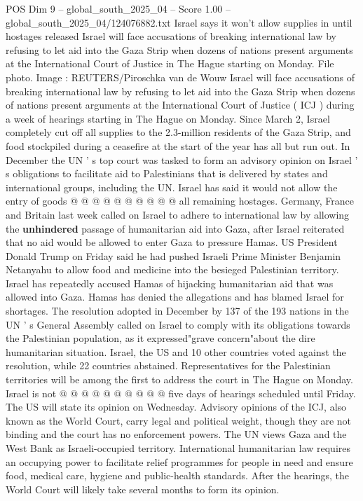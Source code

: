 \begin{textsample}{POS Dim 9 – global\_south\_2025\_04 – Score 1.00 – global\_south\_2025\_04/124076882.txt}  \label{ex:f9_pos_186}
Israel says it won't allow supplies in until hostages released Israel will face accusations of breaking international law by refusing to let aid into the Gaza Strip when dozens of nations present arguments at the International Court of Justice in The Hague starting on Monday.
File photo.
Image : REUTERS/Piroschka van de Wouw Israel will face accusations of breaking international law by refusing to let aid into the Gaza Strip when dozens of nations present arguments at the International Court of Justice ( ICJ ) during a week of hearings starting in The Hague on Monday.
Since March 2, Israel completely cut off all supplies to the 2.3-million residents of the Gaza Strip, and food stockpiled during a ceasefire at the start of the year has all but run out.
In December the UN ' s top court was tasked to form an advisory opinion on Israel ' s obligations to facilitate aid to Palestinians that is delivered by states and international groups, including the UN.
Israel has said it would not allow the entry of goods @ @ @ @ @ @ @ @ @ @ all remaining hostages.
Germany, France and Britain last week called on Israel to adhere to international law by allowing the \textbf{unhindered} passage of humanitarian aid into Gaza, after Israel reiterated that no aid would be allowed to enter Gaza to pressure Hamas.
US President Donald Trump on Friday said he had pushed Israeli Prime Minister Benjamin Netanyahu to allow food and medicine into the besieged Palestinian territory.
Israel has repeatedly accused Hamas of hijacking humanitarian aid that was allowed into Gaza.
Hamas has denied the allegations and has blamed Israel for shortages.
The resolution adopted in December by 137 of the 193 nations in the UN ' s General Assembly called on Israel to comply with its obligations towards the Palestinian population, as it expressed"grave concern"about the dire humanitarian situation.
Israel, the US and 10 other countries voted against the resolution, while 22 countries abstained.
Representatives for the Palestinian territories will be among the first to address the court in The Hague on Monday.
Israel is not @ @ @ @ @ @ @ @ @ @ five days of hearings scheduled until Friday.
The US will state its opinion on Wednesday.
Advisory opinions of the ICJ, also known as the World Court, carry legal and political weight, though they are not binding and the court has no enforcement powers.
The UN views Gaza and the West Bank as Israeli-occupied territory.
International humanitarian law requires an occupying power to facilitate relief programmes for people in need and ensure food, medical care, hygiene and public-health standards.
After the hearings, the World Court will likely take several months to form its opinion.

\end{textsample}

